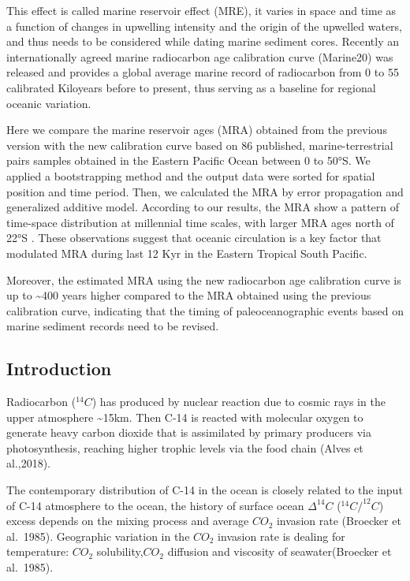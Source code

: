 \documentclass[
]{article}
\begin{document}
This effect is called marine reservoir effect (MRE), it varies in space
and time as a function of changes in upwelling intensity and the origin
of the upwelled waters, and thus needs to be considered while dating
marine sediment cores. Recently an internationally agreed marine
radiocarbon age calibration curve (Marine20) was released and provides a
global average marine record of radiocarbon from 0 to 55 calibrated
Kiloyears before to present, thus serving as a baseline for regional
oceanic variation.

Here we compare the marine reservoir ages (MRA) obtained from the
previous version with the new calibration curve based on 86 published,
marine-terrestrial pairs samples obtained in the Eastern Pacific Ocean
between 0 to 50°S. We applied a bootstrapping method and the output data
were sorted for spatial position and time period. Then, we calculated
the MRA by error propagation and generalized additive model. According
to our results, the MRA show a pattern of time-space distribution at
millennial time scales, with larger MRA ages north of 22°S . These
observations suggest that oceanic circulation is a key factor that
modulated MRA during last 12 Kyr in the Eastern Tropical South Pacific.

Moreover, the estimated MRA using the new radiocarbon age calibration
curve is up to \textasciitilde400 years higher compared to the MRA
obtained using the previous calibration curve, indicating that the
timing of paleoceanographic events based on marine sediment records need
to be revised.

\hypertarget{introduction}{%
\subsection{Introduction}\label{introduction}}

Radiocarbon (\(^{14}C\)) has produced by nuclear reaction due to cosmic
rays in the upper atmosphere \textasciitilde15km. Then C-14 is reacted
with molecular oxygen to generate heavy carbon dioxide that is
assimilated by primary producers via photosynthesis, reaching higher
trophic levels via the food chain (Alves et al.,2018).

The contemporary distribution of C-14 in the ocean is closely related to
the input of C-14 atmosphere to the ocean, the history of surface ocean
\(\Delta^{14}C\) (\(^{14}C/^{12}C\)) excess depends on the mixing
process and average \(CO_2\) invasion rate (Broecker et al.~1985).
Geographic variation in the \(CO_2\) invasion rate is dealing for
temperature: \(CO_2\) solubility,\(CO_2\) diffusion and viscosity of
seawater(Broecker et al.~1985).
\end{document}
